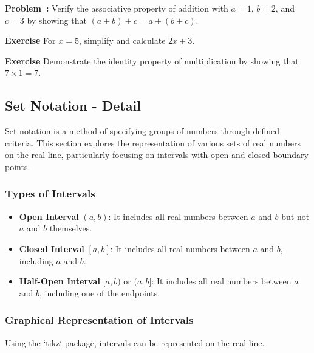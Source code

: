 \documentclass[a4paper,12pt]{book}
\newenvironment{exercise}[1][]
  {\par\medskip\noindent\textbf{Exercise #1} \rmfamily}
  {\medskip}
\newcounter{problem}
\newenvironment{problem}[1][\theproblem]
{\refstepcounter{problem}\par\medskip\noindent\textbf{Problem~#1:} \rmfamily}{\medskip}
\begin{document}
\begin{problem}
Verify the associative property of addition with \( a = 1 \), \( b = 2 \), and \( c = 3 \) by showing that \( (a + b) + c = a + (b + c) \).
\end{problem}


\begin{exercise}
For \( x = 5 \), simplify and calculate \( 2x + 3 \).
\end{exercise}


\begin{exercise}
Demonstrate the identity property of multiplication by showing that \( 7 \times 1 = 7 \).
\end{exercise}




\subsection{Set Notation - Detail}
\label{subsec:set_notation_detail}
Set notation is a method of specifying groups of numbers through defined criteria. This section explores the representation of various sets of real numbers on the real line, particularly focusing on intervals with open and closed boundary points.


\subsubsection{Types of Intervals}
\begin{itemize}
    \item \textbf{Open Interval} \( (a, b) \): It includes all real numbers between \( a \) and \( b \) but not \( a \) and \( b \) themselves.
    \item \textbf{Closed Interval} \( [a, b] \): It includes all real numbers between \( a \) and \( b \), including \( a \) and \( b \).
    \item \textbf{Half-Open Interval} \( [a, b) \) or \( (a, b] \): It includes all real numbers between \( a \) and \( b \), including one of the endpoints.
\end{itemize}


\subsubsection{Graphical Representation of Intervals}
Using the `tikz` package, intervals can be represented on the real line.


\begin{center}
\end{center}
\end{document}
